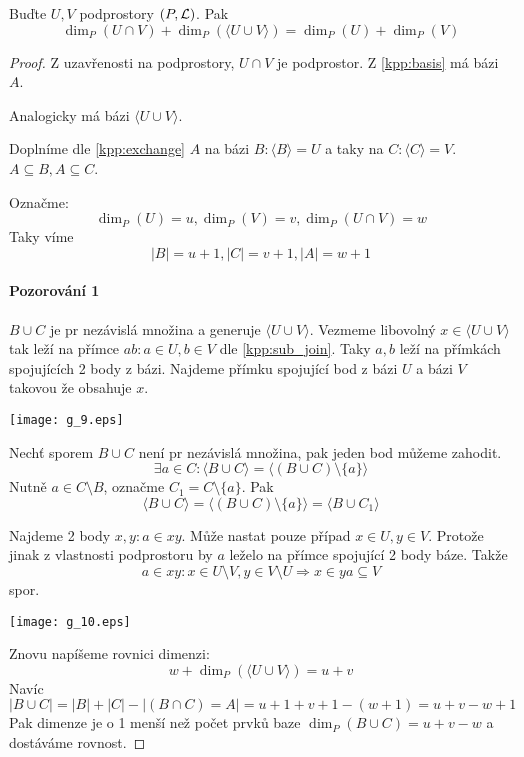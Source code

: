 \begin{theorem}\label{kpp:dim_join_inter}
    Buďte $U,V$ podprostory $(P,\operatorname{\mathcal{L}})$.
    Pak
    \[ \dim_P(U \cap V) + \dim_P(\langle U \cup V \rangle) = \dim_P(U)+\dim_P(V) \]
\end{theorem}
\begin{proof}
	Z uzavřenosti na podprostory, $U \cap V$ je podprostor.
	Z \cref{kpp:basis} má bázi $A$.

	Analogicky má bázi $\langle U \cup V \rangle$.

	Doplníme dle \cref{kpp:exchange} $A$ na bázi $B: \langle B \rangle = U$ a taky na $C: \langle C \rangle = V$.
	$ A \subseteq B, A \subseteq C$.

	Označme:
	\[ \dim_P (U) = u, \dim_P (V) = v, \dim_P (U \cap V) = w \]
	Taky víme
	\[ |B| = u + 1, |C| = v + 1, |A| = w + 1 \]
	\paragraph{Pozorování 1} $B \cup C$ je pr nezávislá množina a generuje $\langle U \cup V \rangle$.
	Vezmeme libovolný $x \in \langle U \cup V \rangle$ tak leží na přímce $ab: a \in U, b \in V$ dle \cref{kpp:sub_join}.
	Taky $a, b$ leží na přímkách spojujících 2 body z bázi.
	Najdeme přímku spojující bod z bázi $U$ a bázi $V$ takovou že obsahuje $x$.

    	\texttt{[image: g\_9.eps]}

	Nechť sporem $B \cup C$ není pr nezávislá množina, pak jeden bod můžeme zahodit.
	\[ \exists a \in C: \langle B \cup C \rangle = \langle (B \cup C) \setminus \{ a \} \rangle \]
	Nutně $a \in C \setminus B$, označme $C_1 = C \setminus \{ a \}$.
	Pak
	\[ \langle B \cup C \rangle = \langle (B \cup C) \setminus \{ a \} \rangle = \langle B \cup C_1 \rangle \]

	Najdeme 2 body $x, y: a \in xy$.
	Může nastat pouze případ $x \in U, y \in V$.
	Protože jinak z vlastnosti podprostoru by $a$ leželo na přímce spojující 2 body báze.
	Takže
	\[ a \in xy: x \in U \setminus V, y \in V \setminus U \Rightarrow x \in ya \subseteq V \]
	spor.

    	\texttt{[image: g\_10.eps]}

	Znovu napíšeme rovnici dimenzi:
	\[ w + \dim_P(\langle U \cup V \rangle) = u + v \]
	Navíc
	\[ |B \cup C| = |B| + |C| - |(B \cap C) = A| =  u + 1 + v + 1 - (w + 1) = u + v - w + 1 \]
	Pak dimenze je o 1 menší než počet prvků baze $\dim_P (B \cup C) = u + v - w$ a dostáváme rovnost.
\end{proof}

